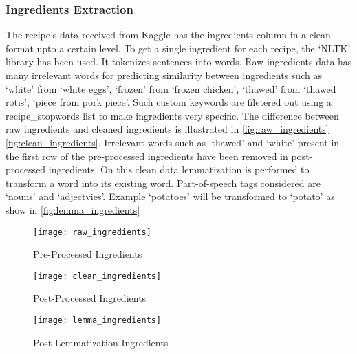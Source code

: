 \subsubsection{Ingredients Extraction}
The recipe's data received from Kaggle has the ingredients column in a clean format upto a certain level. To get a single ingredient for each recipe, the `NLTK' library has been used. It tokenizes sentences into words. Raw ingredients data has many irrelevant words for predicting similarity between ingredients such as `white' from `white eggs', `frozen' from `frozen chicken', `thawed' from `thawed rotis', `piece from pork piece'. Such custom keywords are filetered out using a recipe\_stopwords list to make ingredients very specific. The difference between raw ingredients and cleaned ingredients is illustrated in \autoref{fig:raw_ingredients} \autoref{fig:clean_ingredients}. Irrelevant words such as `thawed' and `white' present in the first row of the pre-processed ingredients have been removed in post-processed ingredients. On this clean data lemmatization is performed to transform a word into its existing word. Part-of-speech tags considered are `nouns' and `adjectvies'. Example `potatoes' will be transformed to `potato' as show in \autoref{fig:lemma_ingredients}

\begin{singlespace}
\begin{figure}[H]
	\centering
	\texttt{[image: raw\_ingredients]}
	\caption{Pre-Processed Ingredients }
	\label{fig:raw_ingredients}
\end{figure}  
\end{singlespace}
\begin{singlespace}
\begin{figure}[H]
	\centering
	\texttt{[image: clean\_ingredients]}
	\caption{Post-Processed Ingredients }
	\label{fig:clean_ingredients}
\end{figure}  
\end{singlespace}
\begin{singlespace}
\begin{figure}[H]
	\centering
	\texttt{[image: lemma\_ingredients]}
	\caption{Post-Lemmatization Ingredients }
	\label{fig:lemma_ingredients}
\end{figure}  
\end{singlespace}

